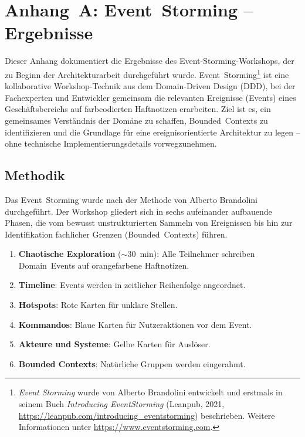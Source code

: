 \section{Anhang~A: Event~Storming -- Ergebnisse}

Dieser Anhang dokumentiert die Ergebnisse des Event-Storming-Workshops, der zu Beginn der Architekturarbeit durchgeführt wurde. Event~Storming\footnote{%
  \textit{Event Storming} wurde von Alberto Brandolini entwickelt und erstmals in seinem Buch
  \textit{Introducing EventStorming} (Leanpub, 2021, \url{https://leanpub.com/introducing_eventstorming})
  beschrieben. Weitere Informationen unter \url{https://www.eventstorming.com}.}
ist eine kollaborative Workshop-Technik aus dem Domain-Driven Design (DDD), bei der Fachexperten und Entwickler gemeinsam die relevanten Ereignisse (Events) eines Geschäftsbereichs auf farbcodierten Haftnotizen erarbeiten. Ziel ist es, ein gemeinsames Verständnis der Domäne zu schaffen, Bounded~Contexts zu identifizieren und die Grundlage für eine ereignisorientierte Architektur zu legen -- ohne technische Implementierungsdetails vorwegzunehmen.

\subsection{Methodik}

Das Event~Storming wurde nach der Methode von Alberto Brandolini durchgeführt. Der Workshop gliedert sich in sechs aufeinander aufbauende Phasen, die vom bewusst unstrukturierten Sammeln von Ereignissen bis hin zur Identifikation fachlicher Grenzen (Bounded~Contexts) führen.

\begin{enumerate}[leftmargin=2em]
  \item \textbf{Chaotische Exploration} ($\sim$30~min): Alle Teilnehmer schreiben Domain~Events auf orangefarbene Haftnotizen.
  \item \textbf{Timeline}: Events werden in zeitlicher Reihenfolge angeordnet.
  \item \textbf{Hotspots}: Rote Karten für unklare Stellen.
  \item \textbf{Kommandos}: Blaue Karten für Nutzeraktionen vor dem Event.
  \item \textbf{Akteure und Systeme}: Gelbe Karten für Auslöser.
  \item \textbf{Bounded Contexts}: Natürliche Gruppen werden eingerahmt.
\end{enumerate}

